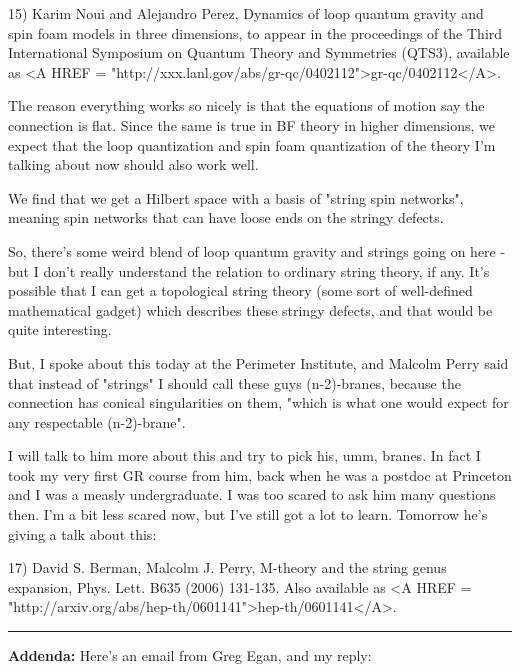 15) Karim Noui and Alejandro Perez, 
Dynamics of loop quantum gravity and spin foam models in three dimensions,
to appear in the proceedings of
the Third International Symposium on Quantum Theory and Symmetries 
(QTS3), available as <A HREF = "http://xxx.lanl.gov/abs/gr-qc/0402112">gr-qc/0402112</A>.

The reason everything works so nicely is that the equations of motion
say the connection is flat.  Since the same is true in BF theory in 
higher dimensions, we expect that the loop quantization and spin foam
quantization of the theory I'm talking about now should also work well.

We find that we get a Hilbert space with a basis of "string spin networks",
meaning spin networks that can have loose ends on the stringy defects.

So, there's some weird blend of loop quantum gravity and strings going
on here - but I don't really understand the relation to ordinary
string theory, if any.  It's possible that I can get a topological
string theory (some sort of well-defined mathematical gadget) which
describes these stringy defects, and that would be quite interesting.

But, I spoke about this today at the Perimeter Institute, and Malcolm
Perry said that instead of "strings" I should call these
guys (n-2)-branes, because the connection has conical singularities on
them, "which is what one would expect for any respectable
(n-2)-brane".

I will talk to him more about this and try to pick his, umm, branes.
In fact I took my very first GR course from him, back when he was a
postdoc at Princeton and I was a measly undergraduate.  I was too
scared to ask him many questions then.  I'm a bit less scared now,
but I've still got a lot to learn.  Tomorrow he's giving a talk about
this:

17) David S. Berman, Malcolm J. Perry, M-theory and the string genus
expansion, Phys. Lett. B635 (2006) 131-135.  Also available as 
<A HREF = "http://arxiv.org/abs/hep-th/0601141">hep-th/0601141</A>.


\par\noindent\rule{\textwidth}{0.4pt}
\textbf{Addenda:} Here's an email from Greg Egan, and my reply:



